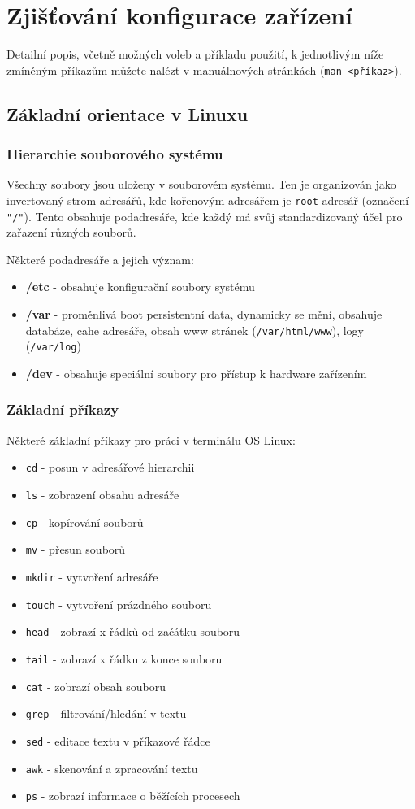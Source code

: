 
\section{Zjišťování konfigurace zařízení}
Detailní popis, včetně možných voleb a příkladu použití, k jednotlivým níže zmíněným příkazům můžete nalézt v manuálnových stránkách (\texttt{man <příkaz>}).
\subsection{Základní orientace v Linuxu}
\subsubsection{Hierarchie souborového systému}
Všechny soubory jsou uloženy v souborovém systému. Ten je organizován jako invertovaný strom adresářů,
kde kořenovým adresářem je \texttt{root} adresář (označení \texttt{"/"}). Tento obsahuje podadresáře,
kde každý má svůj standardizovaný účel pro zařazení různých souborů.

Některé podadresáře a jejich význam:
\begin{itemize}
				\item \textbf{/etc} - obsahuje konfigurační soubory systému
				\item \textbf{/var} - proměnlivá boot persistentní data, dynamicky se mění, obsahuje databáze, cahe adresáře, obsah www stránek (\texttt{/var/html/www}), logy (\texttt{/var/log})
				\item \textbf{/dev} - obsahuje speciální soubory pro přístup k hardware zařízením
\end{itemize}
\subsubsection{Základní příkazy}
Některé základní příkazy pro práci v terminálu OS Linux:
\begin{itemize}
				\item \texttt{cd} - posun v adresářové hierarchii
				\item \texttt{ls} - zobrazení obsahu adresáře
				\item \texttt{cp} - kopírování souborů
				\item \texttt{mv} - přesun souborů
				\item \texttt{mkdir} - vytvoření adresáře
				\item \texttt{touch} - vytvoření prázdného souboru
				\item \texttt{head} - zobrazí x řádků od začátku souboru
				\item \texttt{tail} - zobrazí x řádku z konce souboru
				\item \texttt{cat} - zobrazí obsah souboru
				\item \texttt{grep} - filtrování/hledání v textu
				\item \texttt{sed} - editace textu v příkazové řádce
				\item \texttt{awk} - skenování a zpracování textu
				\item \texttt{ps} - zobrazí informace o běžících procesech
\end{itemize}

